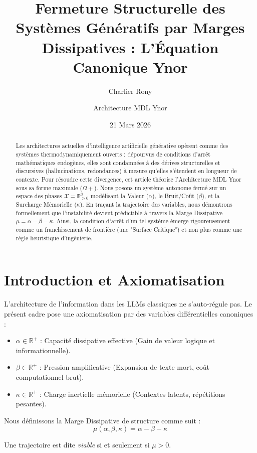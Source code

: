 \documentclass[11pt,a4paper]{article}
\title{\textbf{Fermeture Structurelle des Systèmes Génératifs par Marges Dissipatives : L'Équation Canonique Ynor}}
\author{Charlier Rony \and Architecture MDL Ynor}
\date{21 Mars 2026}
\begin{document}
\maketitle

\begin{abstract}
Les architectures actuelles d'intelligence artificielle générative opèrent comme des systèmes thermodynamiquement ouverts : dépourvus de conditions d'arrêt mathématiques endogènes, elles sont condamnées à des dérives structurelles et discursives (hallucinations, redondances) à mesure qu'elles s'étendent en longueur de contexte. Pour résoudre cette divergence, cet article théorise l'Architecture MDL Ynor sous sa forme maximale ($\Omega+$). Nous posons un système autonome fermé sur un espace des phases $\mathcal{X} = \mathbb{R}_{\ge 0}^3$ modélisant la Valeur ($\alpha$), le Bruit/Coût ($\beta$), et la Surcharge Mémorielle ($\kappa$). En traçant la trajectoire des variables, nous démontrons formellement que l'instabilité devient prédictible à travers la Marge Dissipative $\mu = \alpha - \beta - \kappa$. Ainsi, la condition d'arrêt d'un tel système émerge rigoureusement comme un franchissement de frontière (une "Surface Critique") et non plus comme une règle heuristique d'ingénierie.
\end{abstract}

\section{Introduction et Axiomatisation}
L'architecture de l'information dans les LLMs classiques ne s'auto-régule pas. Le présent cadre pose une axiomatisation par des variables différentielles canoniques :
\begin{itemize}
 \item $\alpha \in \mathbb{R}^+$ : Capacité dissipative effective (Gain de valeur logique et informationnelle).
 \item $\beta \in \mathbb{R}^+$ : Pression amplificative (Expansion de texte mort, coût computationnel brut).
 \item $\kappa \in \mathbb{R}^+$ : Charge inertielle mémorielle (Contextes latents, répétitions pesantes).
\end{itemize}

Nous définissons la Marge Dissipative de structure comme suit :
\begin{equation}
 \mu(\alpha, \beta, \kappa) = \alpha - \beta - \kappa
\end{equation}

Une trajectoire est dite \textit{viable} si et seulement si $\mu > 0$.
\end{document}
